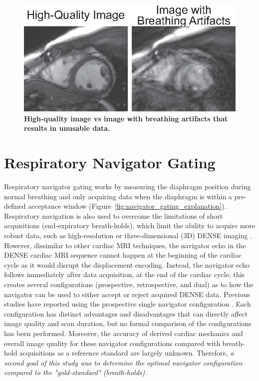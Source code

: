 	\begin{figure}
		\centering
		\includegraphics{figures/intro/good_bad_image_breathing_artifacts}
		\caption[High-quality image vs image with breathing artifacts that results in unusable data]{\textbf{High-quality image vs image with breathing artifacts that results in unusable data.}}
		\label{fig:good_bad_image_breathing_artifacts}
	\end{figure}

\section{Respiratory Navigator Gating}
	Respiratory navigator gating works by measuring the diaphragm position during normal breathing and only acquiring data when the diaphragm is within a pre-defined acceptance window (Figure~\ref{fig:navigator_gating_explanation}). Respiratory navigation is also used to overcome the limitations of short acquisitions (end-expiratory breath-holds), which limit the ability to acquire more robust data, such as high-resolution \cite{Wehner2014} or three-dimensional (3D) DENSE imaging \cite{Zhong2010a,Kar2014,Auger2012}. However, dissimilar to other cardiac MRI techniques, the navigator echo in the DENSE cardiac MRI sequence cannot happen at the beginning of the cardiac cycle as it would disrupt the displacement encoding. Instead, the navigator echo follows immediately after data acquisition, at the end of the cardiac cycle; this creates several configurations (prospective, retrospective, and dual) as to how the navigator can be used to either accept or reject acquired DENSE data. Previous studies have reported using the prospective single navigator configuration \cite{Zhong2010a,Auger2012}. Each configuration has distinct advantages and disadvantages that can directly affect image quality and scan duration, but no formal comparison of the configurations has been performed. Moreover, the accuracy of derived cardiac mechanics and overall image quality for these navigator configurations compared with breath-hold acquisitions as a reference standard are largely unknown. Therefore, \textit{a second goal of this study was to determine the optimal navigator configuration compared to the "gold-standard" (breath-holds).}
	
